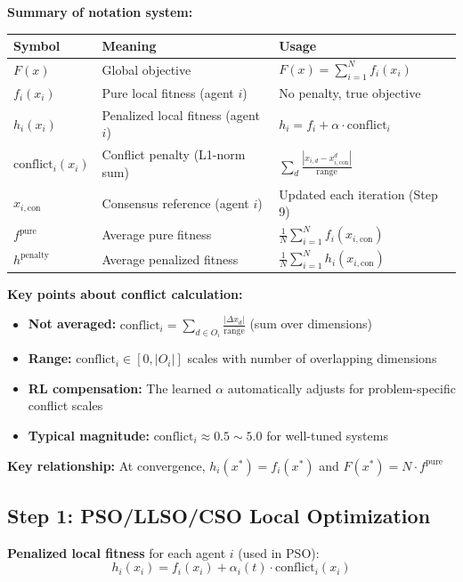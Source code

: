 \documentclass[11pt,a4paper]{article}
\begin{document}
\textbf{Summary of notation system:}
\begin{center}
\begin{tabular}{|l|l|l|}
\hline
\textbf{Symbol} & \textbf{Meaning} & \textbf{Usage} \\
\hline
$F(x)$ & Global objective & $F(x) = \sum_{i=1}^N f_i(x_i)$ \\
$f_i(x_i)$ & Pure local fitness (agent $i$) & No penalty, true objective \\
$h_i(x_i)$ & Penalized local fitness (agent $i$) & $h_i = f_i + \alpha \cdot \text{conflict}_i$ \\
$\text{conflict}_i(x_i)$ & Conflict penalty (L1-norm sum) & $\sum_d \frac{|x_{i,d} - x_{i,\text{con}}^d|}{\text{range}}$ \\
$x_{i,\text{con}}$ & Consensus reference (agent $i$) & Updated each iteration (Step 9) \\
$f^{\text{pure}}$ & Average pure fitness & $\frac{1}{N}\sum_{i=1}^N f_i(x_{i,\text{con}})$ \\
$h^{\text{penalty}}$ & Average penalized fitness & $\frac{1}{N}\sum_{i=1}^N h_i(x_{i,\text{con}})$ \\
\hline
\end{tabular}
\end{center}

\textbf{Key points about conflict calculation:}
\begin{itemize}
    \item \textbf{Not averaged:} $\text{conflict}_i = \sum_{d \in O_i} \frac{|Δx_d|}{\text{range}}$ (sum over dimensions)
    \item \textbf{Range:} $\text{conflict}_i \in [0, |O_i|]$ scales with number of overlapping dimensions
    \item \textbf{RL compensation:} The learned $\alpha$ automatically adjusts for problem-specific conflict scales
    \item \textbf{Typical magnitude:} $\text{conflict}_i \approx 0.5 \sim 5.0$ for well-tuned systems
\end{itemize}

\textbf{Key relationship:} At convergence, $h_i(x^*) = f_i(x^*)$ and $F(x^*) = N \cdot f^{\text{pure}}$

\subsection{Step 1: PSO/LLSO/CSO Local Optimization}
\textbf{Penalized local fitness} for each agent $i$ (used in PSO):
\begin{equation}
h_i(x_i) = f_i(x_i) + \alpha_i(t) \cdot \text{conflict}_i(x_i)
\end{equation}
\end{document}
